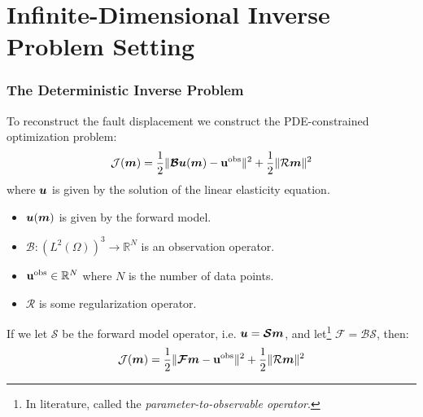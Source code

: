 \documentclass[
  pdf,
  10pt,
  xcolor={svgnames},
]{beamer}
\newcommand{\mc}[1]{\mathcal{#1}}
\newcommand{\mcb}[1]{\boldsymbol{\mathcal{#1}}}
\newcommand{\R}{\mathbb{R}}
\renewcommand{\vec}[1]{{\mathchoice
                     {\mbox{\boldmath$\displaystyle{#1}$}}
                     {\mbox{\boldmath$\textstyle{#1}$}}
                     {\mbox{\boldmath$\scriptstyle{#1}$}}
                     {\mbox{\boldmath$\scriptscriptstyle{#1}$}}}}
\newcommand{\obs}{\mathbf{u}^{\rm obs}}
\begin{document}
\section{Infinite-Dimensional Inverse Problem Setting}
\begin{frame}
  \frametitle{The Deterministic Inverse Problem}
  To reconstruct the fault displacement we construct the PDE-constrained
  optimization problem:
  \[
    \mc{J}(\vec{m})
    = \frac{1}{2} \| \mcb{B}\vec{u}(\vec{m}) - \obs \|^2
    + \frac{1}{2} \| \mc{R}\vec{m} \|^2
  \]
  where $\vec{u}$ is given by the solution of the linear elasticity equation.
  \begin{itemize}
    \item $\vec{u}(\vec{m})$ is given by the forward model.
    \item $\mcb{B}: (L^2(\Omega))^3 \to \R^N$ is an observation operator.
    \item $\obs \in \R^N$ where $N$ is the number of data points.
    \item $\mc{R}$ is some regularization operator.
  \end{itemize}
  \pause
  If we let $\mcb{S}$ be the forward model operator, i.e. $\vec{u} = \mcb{S}
    \vec{m}$, and let\footnote{%
    In literature, called the {\em parameter-to-observable operator}.
  } $\mcb{F} = \mcb{B} \mcb{S}$, then:
  \[
    \mc{J}(\vec{m})
    = \frac{1}{2} \| \mcb{F}\vec{m} - \obs \|^2
    + \frac{1}{2} \| \mc{R}\vec{m} \|^2
  \]
\end{frame}
\end{document}
